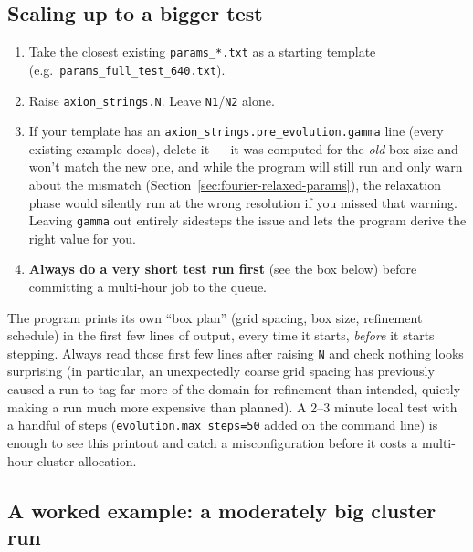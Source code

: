 \documentclass[11pt]{article}
\begin{document}
\subsection{Scaling up to a bigger test}
\label{sec:scaling-up}

\begin{enumerate}
  \item Take the closest existing \texttt{params\_*.txt} as a starting template (e.g.\
        \texttt{params\_full\_test\_640.txt}).
  \item Raise \texttt{axion\_strings.N}. Leave \texttt{N1}/\texttt{N2} alone.
  \item If your template has an \texttt{axion\_strings.pre\_evolution.gamma} line (every existing example
        does), delete it --- it was computed for the \emph{old} box size and won't match the new one, and
        while the program will still run and only warn about the mismatch (Section~\ref{sec:fourier-relaxed-params}),
        the relaxation phase would silently run at the wrong resolution if you missed that warning. Leaving
        \texttt{gamma} out entirely sidesteps the issue and lets the program derive the right value for you.
  \item \textbf{Always do a very short test run first} (see the box below) before committing a multi-hour
        job to the queue.
\end{enumerate}

\begin{warn}
The program prints its own ``box plan'' (grid spacing, box size, refinement schedule) in the first few
lines of output, every time it starts, \emph{before} it starts stepping. Always read those first few lines
after raising \texttt{N} and check nothing looks surprising (in particular, an unexpectedly coarse grid
spacing has previously caused a run to tag far more of the domain for refinement than intended, quietly
making a run much more expensive than planned). A 2--3 minute local test with a handful of steps
(\texttt{evolution.max\_steps=50} added on the command line) is enough to see this printout and catch a
misconfiguration before it costs a multi-hour cluster allocation.
\end{warn}

\subsection{A worked example: a moderately big cluster run}
\label{sec:worked-example}
\end{document}
